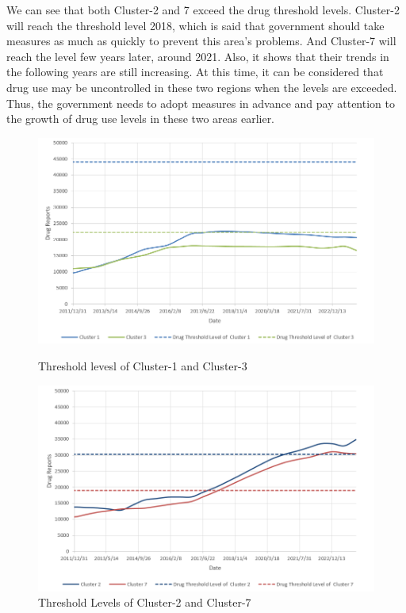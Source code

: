 \documentclass[11pt]{article}
\begin{document}
We can see that both Cluster-2 and 7 exceed the drug threshold levels. Cluster-2 will reach the threshold level 2018, which is said that government should take measures as much as quickly to prevent this area’s problems. And Cluster-7 will reach the level few years later, around 2021. Also, it shows that their trends in the following years are still increasing. At this time, it can be considered that drug use may be uncontrolled in these two regions when the levels are exceeded. Thus, the government needs to adopt measures in advance and pay attention to the growth of drug use levels in these two areas earlier.

\begin{figure}[H]
	\centering %
	\begin{minipage}[b]{0.45\textwidth} %
		\centering %
		\includegraphics[scale=0.37]{./figures/6.png} %
		\caption{Threshold levesl of Cluster-1 and Cluster-3}
		\label{Fig6}
	\end{minipage}
	\begin{minipage}[b]{0.45\textwidth} %
		\centering %
		\includegraphics[scale=0.37]{./figures/7.png}%
		\caption{Threshold Levels of Cluster-2 and Cluster-7}
		\label{Fig7}
	\end{minipage}
\end{figure}
\end{document}
